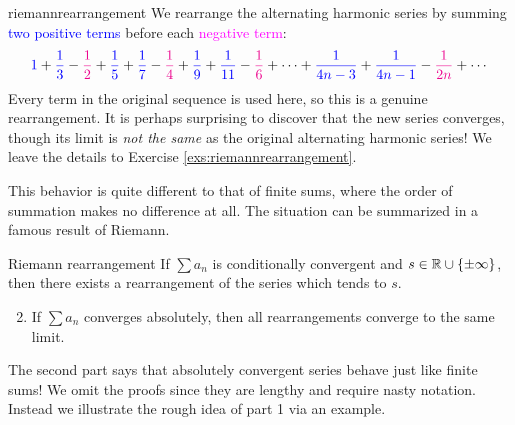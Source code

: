 \begin{example}{}{riemannrearrangement}
	We rearrange the alternating harmonic series by summing \textcolor{blue}{two positive terms} before each \textcolor{magenta}{negative term}:
	\[
% 		
		\textcolor{blue}{1}+\textcolor{blue}{\frac 13} -\textcolor{magenta}{\frac 12} +\textcolor{blue}{\frac 15} +\textcolor{blue}{\frac 17} -\textcolor{magenta}{\frac 14} +\textcolor{blue}{\frac 19} +\textcolor{blue}{\frac 1{11}} -\textcolor{magenta}{\frac 16}  +\cdots +\textcolor{blue}{\frac 1{4n-3}} +\textcolor{blue}{\frac 1{4n-1}} -\textcolor{magenta}{\frac 1{2n}} +\cdots
	\]
	Every term in the original sequence is used here, so this is a genuine rearrangement. It is perhaps surprising to discover that the new series converges, though its limit is \emph{not the same} as the original alternating harmonic series! We leave the details to Exercise \ref{exs:riemannrearrangement}.
\end{example}

This behavior is quite different to that of finite sums, where the order of summation makes no difference at all. The situation can be summarized in a famous result of Riemann.

\begin{thm}{Riemann rearrangement}{}
	\exstart If $\sum a_n$ is conditionally convergent and $s\in\mathbb{R}\cup\{\pm\infty\}$, then there exists a rearrangement of the series which tends\footnotemark{} to $s$.
\begin{enumerate}\setcounter{enumi}{1}
  \item If $\sum a_n$ converges absolutely, then all rearrangements converge to the same limit.
\end{enumerate}
\end{thm}


The second part says that absolutely convergent series behave just like finite sums! We omit the proofs since they are lengthy and require nasty notation. Instead we illustrate the rough idea of part 1 via an example.

